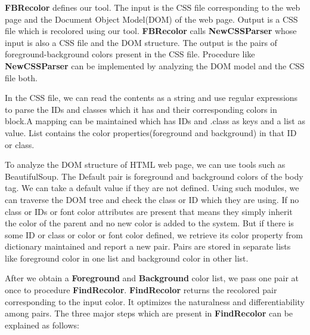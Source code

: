 
\textbf{FBRecolor} defines our tool. The input is the CSS file corresponding to the web page and the Document Object Model(DOM) of the web page. Output is a CSS file which is recolored using our tool. \textbf{FBRecolor} calls \textbf{NewCSSParser} whose input is also a CSS file and the DOM structure. The output is the pairs of foreground-background colors present in the CSS file. Procedure like \textbf{NewCSSParser} can be implemented by analyzing the DOM model and the CSS file both. 


In the CSS file, we can read the contents as a string and use regular expressions to parse the IDs and classes which it has and their corresponding colors in block.A mapping can be maintained which has IDs and .class as keys and a list as value. List contains the color properties(foreground and background) in that ID or class.

  
To analyze the DOM structure of HTML web page, we can use tools such as BeautifulSoup. The Default pair is foreground and background colors of the body tag. We can take a default value if they are not defined. Using such modules, we can traverse the DOM tree and check the class or ID which they are using. If no class or IDs or font color attributes are present that means they simply inherit the color of the parent and no new color is added to the system. But if there is some ID or class or color or font color defined, we retrieve its color property from dictionary maintained and report a new pair. Pairs are stored in separate lists like foreground color in one list and background color in other list. 


After we obtain a \textbf{Foreground} and \textbf{Background} color list, we pass one pair at once to procedure \textbf{FindRecolor}. \textbf{FindRecolor} returns the recolored pair corresponding to the input color. It optimizes the naturalness and differentiability among pairs. The three major steps which are present in \textbf{FindRecolor} can be explained as follows:

